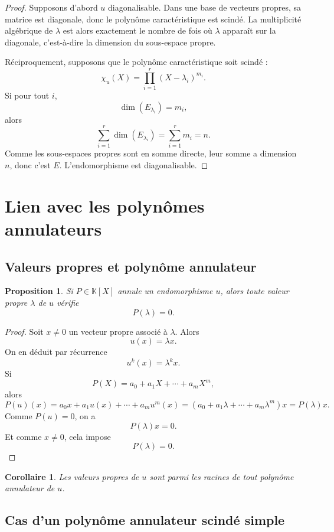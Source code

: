 \documentclass[11pt,a4paper]{article}
\newtheorem{proposition}[definition]{Proposition}
\newtheorem{corollaire}[definition]{Corollaire}
\theoremstyle{remark}
\newcommand{\K}{\mathbb{K}}
\begin{document}
\begin{proof}
Supposons d’abord \(u\) diagonalisable. Dans une base de vecteurs propres, sa matrice est diagonale, donc le polynôme caractéristique est scindé. La multiplicité algébrique de \(\lambda\) est alors exactement le nombre de fois où \(\lambda\) apparaît sur la diagonale, c’est-à-dire la dimension du sous-espace propre.

Réciproquement, supposons que le polynôme caractéristique soit scindé :
\[
\chi_u(X)=\prod_{i=1}^r (X-\lambda_i)^{m_i}.
\]
Si pour tout \(i\),
\[
\dim(E_{\lambda_i})=m_i,
\]
alors
\[
\sum_{i=1}^r \dim(E_{\lambda_i})=\sum_{i=1}^r m_i=n.
\]
Comme les sous-espaces propres sont en somme directe, leur somme a dimension \(n\), donc c’est \(E\). L’endomorphisme est diagonalisable.
\end{proof}

\section{Lien avec les polynômes annulateurs}

\subsection{Valeurs propres et polynôme annulateur}

\begin{proposition}
Si \(P\in\K[X]\) annule un endomorphisme \(u\), alors toute valeur propre \(\lambda\) de \(u\) vérifie
\[
P(\lambda)=0.
\]
\end{proposition}

\begin{proof}
Soit \(x\neq 0\) un vecteur propre associé à \(\lambda\). Alors
\[
u(x)=\lambda x.
\]
On en déduit par récurrence
\[
u^k(x)=\lambda^k x.
\]
Si
\[
P(X)=a_0+a_1X+\cdots+a_mX^m,
\]
alors
\[
P(u)(x)=a_0x+a_1u(x)+\cdots+a_mu^m(x)
=(a_0+a_1\lambda+\cdots+a_m\lambda^m)x=P(\lambda)x.
\]
Comme \(P(u)=0\), on a
\[
P(\lambda)x=0.
\]
Et comme \(x\neq 0\), cela impose
\[
P(\lambda)=0.
\]
\end{proof}

\begin{corollaire}
Les valeurs propres de \(u\) sont parmi les racines de tout polynôme annulateur de \(u\).
\end{corollaire}

\subsection{Cas d’un polynôme annulateur scindé simple}
\end{document}
